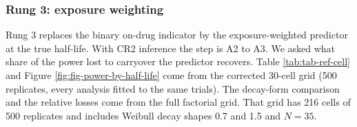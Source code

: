 \documentclass[
  11pt,
]{article}
\begin{document}
\subsubsection{Rung 3: exposure weighting}\label{sec-rung3}

Rung 3 replaces the binary on-drug indicator by the exposure-weighted
predictor at the true half-life. With CR2 inference the step is A2 to
A3. We asked what share of the power lost to carryover the predictor
recovers. Table \ref{tab:tab-ref-cell} and Figure
\ref{fig:fig-power-by-half-life} come from the corrected 30-cell
grid (500 replicates, every analysis fitted to the same trials). The
decay-form comparison and the relative losses come from the full
factorial grid. That grid has 216 cells of 500 replicates and
includes Weibull decay shapes 0.7 and 1.5 and \(N = 35\).
\end{document}
